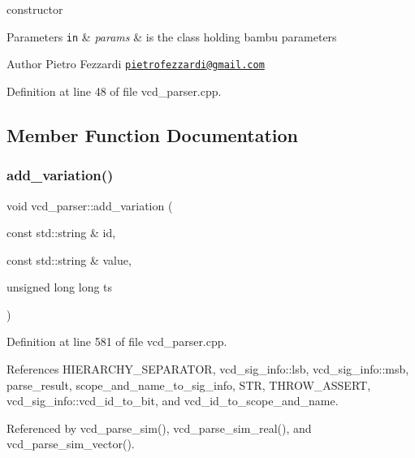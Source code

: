 constructor 


\begin{DoxyParams}[1]{Parameters}
\mbox{\tt in}  & {\em params} & is the class holding bambu parameters\\
\hline
\end{DoxyParams}
\begin{DoxyAuthor}{Author}
Pietro Fezzardi \href{mailto:pietrofezzardi@gmail.com}{\tt pietrofezzardi@gmail.\+com} 
\end{DoxyAuthor}


Definition at line 48 of file vcd\+\_\+parser.\+cpp.



\subsection{Member Function Documentation}
\mbox{\label{classvcd__parser_ae385037530fb4eb1d8eac4853b92a758}} 
\subsubsection{\texorpdfstring{add\+\_\+variation()}{add\_variation()}}
{\footnotesize\ttfamily void vcd\+\_\+parser\+::add\+\_\+variation (\begin{DoxyParamCaption}\item[{const std\+::string \&}]{id,  }\item[{const std\+::string \&}]{value,  }\item[{unsigned long long}]{ts }\end{DoxyParamCaption})\hspace{0.3cm}{\ttfamily [private]}}



Definition at line 581 of file vcd\+\_\+parser.\+cpp.



References H\+I\+E\+R\+A\+R\+C\+H\+Y\+\_\+\+S\+E\+P\+A\+R\+A\+T\+OR, vcd\+\_\+sig\+\_\+info\+::lsb, vcd\+\_\+sig\+\_\+info\+::msb, parse\+\_\+result, scope\+\_\+and\+\_\+name\+\_\+to\+\_\+sig\+\_\+info, S\+TR, T\+H\+R\+O\+W\+\_\+\+A\+S\+S\+E\+RT, vcd\+\_\+sig\+\_\+info\+::vcd\+\_\+id\+\_\+to\+\_\+bit, and vcd\+\_\+id\+\_\+to\+\_\+scope\+\_\+and\+\_\+name.



Referenced by vcd\+\_\+parse\+\_\+sim(), vcd\+\_\+parse\+\_\+sim\+\_\+real(), and vcd\+\_\+parse\+\_\+sim\+\_\+vector().

